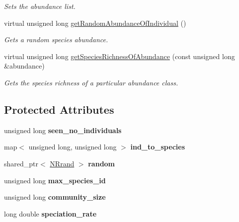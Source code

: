 \begin{DoxyCompactItemize}
\begin{DoxyCompactList}\small\item\em Sets the abundance list. \end{DoxyCompactList}\item 
virtual unsigned long \hyperlink{class_species_abundances_handler_a5bd4781276f15255431a00863d182cba}{get\+Random\+Abundance\+Of\+Individual} ()
\begin{DoxyCompactList}\small\item\em Gets a random species abundance. \end{DoxyCompactList}\item 
virtual unsigned long \hyperlink{class_species_abundances_handler_a33708e99d7eb07385aea58aea925e1bc}{get\+Species\+Richness\+Of\+Abundance} (const unsigned long \&abundance)
\begin{DoxyCompactList}\small\item\em Gets the species richness of a particular abundance class. \end{DoxyCompactList}\end{DoxyCompactItemize}
\subsection*{Protected Attributes}
\begin{DoxyCompactItemize}
\item 
unsigned long {\bfseries seen\+\_\+no\+\_\+individuals}\hypertarget{class_analytical_species_abundances_handler_a7e428f1c37385a4bd25abff4c66c249e}{}\label{class_analytical_species_abundances_handler_a7e428f1c37385a4bd25abff4c66c249e}

\item 
map$<$ unsigned long, unsigned long $>$ {\bfseries ind\+\_\+to\+\_\+species}\hypertarget{class_analytical_species_abundances_handler_a6eaf9005d83772fd23d6249777ecab4c}{}\label{class_analytical_species_abundances_handler_a6eaf9005d83772fd23d6249777ecab4c}

\item 
shared\+\_\+ptr$<$ \hyperlink{class_n_rrand}{N\+Rrand} $>$ {\bfseries random}\hypertarget{class_species_abundances_handler_a9adf19e91e8b615a0aeba2d96be95109}{}\label{class_species_abundances_handler_a9adf19e91e8b615a0aeba2d96be95109}

\item 
unsigned long {\bfseries max\+\_\+species\+\_\+id}\hypertarget{class_species_abundances_handler_a7b020381eff35fc37d0bd97782728d6b}{}\label{class_species_abundances_handler_a7b020381eff35fc37d0bd97782728d6b}

\item 
unsigned long {\bfseries community\+\_\+size}\hypertarget{class_species_abundances_handler_afb4de4e0814f76d4c978f93a6f7cdabd}{}\label{class_species_abundances_handler_afb4de4e0814f76d4c978f93a6f7cdabd}

\item 
long double {\bfseries speciation\+\_\+rate}\hypertarget{class_species_abundances_handler_aa945e9f660b2d8aa7d5b36d7bbd0fda6}{}\label{class_species_abundances_handler_aa945e9f660b2d8aa7d5b36d7bbd0fda6}

\end{DoxyCompactItemize}


